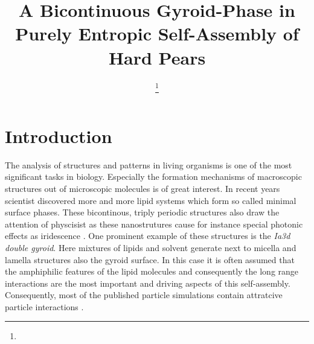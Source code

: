 \documentclass[epj,twocolumn]{webofc}
\begin{document}
%
\title{A Bicontinuous Gyroid-Phase in Purely Entropic Self-Assembly of Hard Pears}

\author{ \fnsep\thanks{} \and
         \and 
         \and
         \and
         
}


\abstract{%
}
%
\maketitle
%


\section{Introduction}
\label{sec:Intro}

The analysis of structures and patterns in living organisms is one of the most significant tasks in biology. Especially the formation mechanisms of macroscopic structures out of microscopic molecules is of great interest. In recent 
years scientist discovered more and more lipid systems which form so called minimal surface phases. These bicontinous, triply periodic structures also draw the attention of physcisist as these nanostrutures cause for instance special 
photonic effects as iridescence \cite{}. One prominent example of these structures is the \textit{Ia3d double gyroid}. Here mixtures of lipids and solvent generate next to micella and lamella structures also the gyroid surface.
In this case it is often assumed that the amphiphilic features of the lipid molecules and consequently the long range interactions are the most important and driving aspects of this self-assembly. Consequently, most of the published 
particle simulations contain attratcive particle interactions \cite{}.\\
\end{document}
